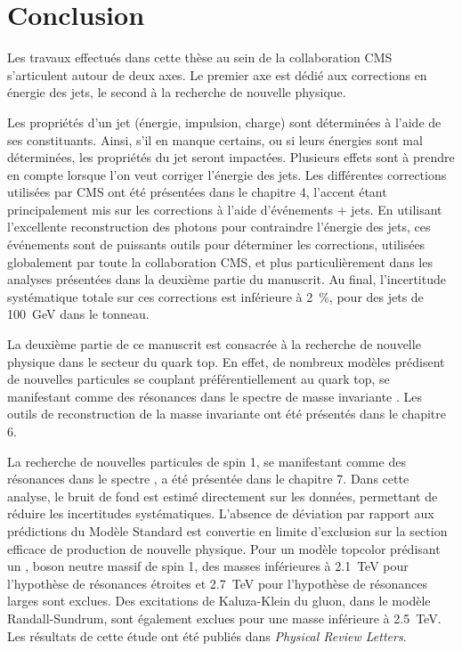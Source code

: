 \chapter*{Conclusion}

Les travaux effectués dans cette thèse au sein de la collaboration CMS s'articulent autour de deux axes. Le premier axe est dédié aux corrections en énergie des jets, le second à la recherche de nouvelle physique.

\medskip

Les propriétés d'un jet (énergie, impulsion, charge) sont déterminées à l'aide de ses constituants. Ainsi, s'il en manque certains, ou si leurs énergies sont mal déterminées, les propriétés du jet seront impactées. Plusieurs effets sont à prendre en compte lorsque l'on veut corriger l'énergie des jets. Les différentes corrections utilisées par CMS ont été présentées dans le chapitre 4, l'accent étant principalement mis sur les corrections à l'aide d'événements \Pgamma + jets. En utilisant l'excellente reconstruction des photons pour contraindre l'énergie des jets, ces événements sont de puissants outils pour déterminer les corrections, utilisées globalement par toute la collaboration CMS, et plus particulièrement dans les analyses présentées dans la deuxième partie du manuscrit. Au final, l'incertitude systématique totale sur ces corrections est inférieure à \SI{2}{\%}, pour des jets de \SI{100}{\GeV} dans le tonneau.

\bigskip

La deuxième partie de ce manuscrit est consacrée à la recherche de nouvelle physique dans le secteur du quark top. En effet, de nombreux modèles prédisent de nouvelles particules se couplant préférentiellement au quark top, se manifestant comme des résonances dans le spectre de masse invariante \ttbar. Les outils de reconstruction de la masse invariante ont été présentés dans le chapitre 6.

\smallskip

La recherche de nouvelles particules de spin 1, se manifestant comme des résonances dans le spectre \mtt, a été présentée dans le chapitre 7. Dans cette analyse, le bruit de fond est estimé directement sur les données, permettant de réduire les incertitudes systématiques. L'absence de déviation par rapport aux prédictions du Modèle Standard est convertie en limite d'exclusion sur la section efficace de production de nouvelle physique. Pour un modèle topcolor prédisant un \zprime, boson neutre massif de spin 1, des masses inférieures à \SI{2.1}{\TeV} pour l'hypothèse de résonances étroites et \SI{2.7}{\TeV} pour l'hypothèse de résonances larges sont exclues. Des excitations de Kaluza-Klein du gluon, dans le modèle Randall-Sundrum, sont également exclues pour une masse inférieure à \SI{2.5}{\TeV}. Les résultats de cette étude ont été publiés dans \emph{Physical Review Letters}.

